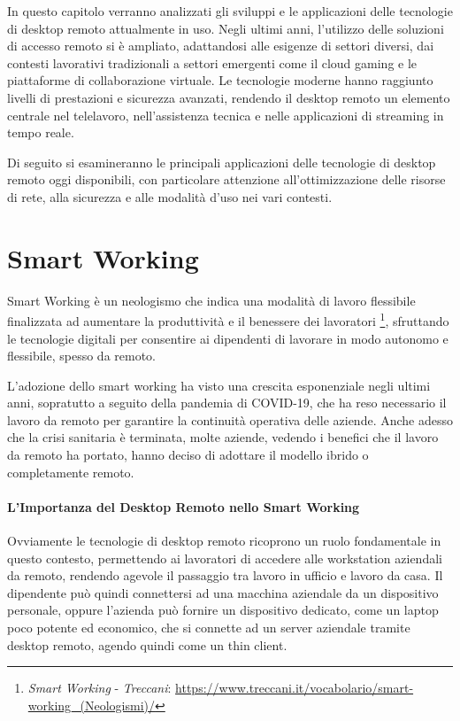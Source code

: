 \documentclass[12pt,a4paper,openright,twoside]{book}
\begin{document}
In questo capitolo verranno analizzati gli sviluppi e le applicazioni delle tecnologie di desktop remoto attualmente in uso. Negli ultimi anni, l'utilizzo delle soluzioni di accesso remoto si è ampliato, adattandosi alle esigenze di settori diversi, dai contesti lavorativi tradizionali a settori emergenti come il cloud gaming e le piattaforme di collaborazione virtuale. Le tecnologie moderne hanno raggiunto livelli di prestazioni e sicurezza avanzati, rendendo il desktop remoto un elemento centrale nel telelavoro, nell'assistenza tecnica e nelle applicazioni di streaming in tempo reale.

Di seguito si esamineranno le principali applicazioni delle tecnologie di desktop remoto oggi disponibili, con particolare attenzione all’ottimizzazione delle risorse di rete, alla sicurezza e alle modalità d'uso nei vari contesti.

\section{Smart Working}

Smart Working è un neologismo che indica una modalità di lavoro flessibile finalizzata ad aumentare la produttività e il benessere dei lavoratori \footnote{\emph{Smart Working} - \emph{Treccani}: \url{https://www.treccani.it/vocabolario/smart-working_(Neologismi)/}}, sfruttando le tecnologie digitali per consentire ai dipendenti di lavorare in modo autonomo e flessibile, spesso da remoto.

L'adozione dello smart working ha visto una crescita esponenziale negli ultimi anni, sopratutto a seguito della pandemia di COVID-19, che ha reso necessario il lavoro da remoto per garantire la continuità operativa delle aziende. Anche adesso che la crisi sanitaria è terminata, molte aziende, vedendo i benefici che il lavoro da remoto ha portato, hanno deciso di adottare il modello ibrido o completamente remoto.

\paragraph{L'Importanza del Desktop Remoto nello Smart Working}
Ovviamente le tecnologie di desktop remoto ricoprono un ruolo fondamentale in questo contesto, permettendo ai lavoratori di accedere alle workstation aziendali da remoto, rendendo agevole il passaggio tra lavoro in ufficio e lavoro da casa. Il dipendente può quindi connettersi ad una macchina aziendale da un dispositivo personale, oppure l'azienda può fornire un dispositivo dedicato, come un laptop poco potente ed economico, che si connette ad un server aziendale tramite desktop remoto, agendo quindi come un thin client.
\end{document}
